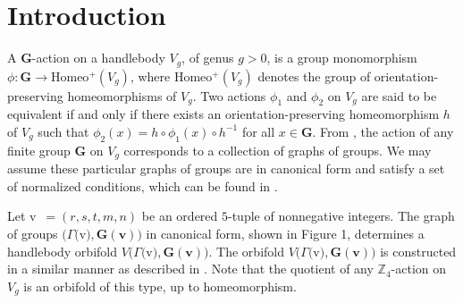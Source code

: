\documentclass{amsart}
\theoremstyle{definition}
\numberwithin{equation}{section}
\begin{document}
\begin{abstract} 
In this paper we consider all orientation-preserving $\mathbb{Z}_{4}$-actions on $3$-dimensional handlebodies $V_g$ of genus $g>0$. We study the graph of groups $(\Gamma($v$),\mathbf{G(v)})$, which determines a handlebody orbifold $V(\Gamma($v$),{\mathbf{G(v)}})\simeq{V_g}/\mathbb{Z}_{4}$. This algebraic characterization is used to enumerate the total number of $\mathbb{Z}_{4}$ group actions on such handlebodies, up to equivalence.
\end{abstract}

\maketitle


\section{\bf Introduction}

A {$\mathbf{G}$-action} on  a handlebody $V_g$, of genus $g>0$, is a group monomorphism $\phi:{\mathbf{G}}\longrightarrow{}$Homeo$^+(V_g)$, where Homeo$^+(V_g)$ denotes the group of orientation-preserving homeomorphisms of $V_g$. Two actions $\phi_1$ and $\phi_2$ on $V_g$ are said to be equivalent if and only if there exists an orientation-preserving homeomorphism $h$ of $V_g$ such that $\phi_2(x)=h\circ\phi_1(x)\circ{h^{-1}}$ for all $x\in\mathbf{G}$. From \cite{MMZ}, the action of any finite group $\mathbf{G}$ on $V_g$ corresponds to a collection of graphs of groups.  We may assume these particular graphs of groups are in canonical form and satisfy a set of normalized conditions, which can be found in \cite{KM}.  

Let v\ $=(r,s,t,m,n)$ be an ordered $5$-tuple of nonnegative integers. The graph of groups $(\Gamma($v$),\mathbf{G(v)})$ in canonical form, shown in Figure 1, determines a handlebody orbifold $V(\Gamma($v$),\mathbf{G(v)})$. The orbifold $V(\Gamma($v$),{\mathbf{G(v)}})$ is constructed in a similar manner as described in \cite{KM}. Note that the quotient of any $\mathbb{Z}_{4}$-action on $V_g$ is an orbifold of this type, up to homeomorphism. 
\end{document}
